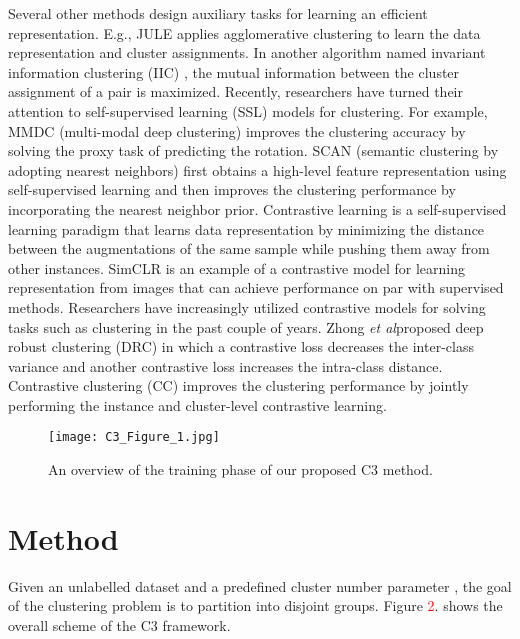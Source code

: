 \documentclass{bmvc2k}
\newcommand{\shadow}[1]{}
\newcommand{\red}[1]{\textcolor{red}{#1}}
\def\s{\shadow}
\def\r{\red}
\def\etal{\emph{et al}\bmvaOneDot}
\begin{document}
Several other methods design auxiliary tasks for learning an efficient representation. E.g., JULE \cite{JULE} applies agglomerative clustering to learn the data representation and cluster assignments. In another algorithm named invariant information clustering (IIC) \cite{IIC}, the mutual information between the cluster assignment of a pair is maximized.
Recently, researchers have turned their attention to self-supervised learning (SSL) models for clustering. For example, MMDC (multi-modal deep clustering) \cite{MMDC} improves the clustering accuracy by solving the proxy task of predicting the rotation. SCAN (semantic clustering by adopting nearest neighbors) \cite{SCAN} first obtains a high-level feature representation using self-supervised learning and then improves the clustering performance by incorporating the nearest neighbor prior.
Contrastive learning is a self-supervised learning paradigm that learns data representation by minimizing the distance between the augmentations of the same sample while pushing them away from other instances. SimCLR \cite{SimCLR} is an example of a contrastive model for learning representation from images that can achieve performance on par with supervised methods. Researchers have increasingly utilized contrastive models for solving tasks such as clustering in the past couple of years. Zhong \etal proposed deep robust clustering (DRC) \cite{DRC} in which a contrastive loss decreases the inter-class variance and another contrastive loss increases the intra-class distance. Contrastive clustering (CC) \cite{CC} improves the clustering performance by jointly performing the instance and cluster-level contrastive learning.
\begin{figure*}[t]
\label{fig11}
  \centering
  \texttt{[image: C3\_Figure\_1.jpg]}
  \caption{An overview of the training phase of our proposed C3 method.}
  \vspace{-7mm}
\end{figure*}
\vspace{-5mm}
\section{Method}
\label{sec:method}
Given an unlabelled dataset  and a predefined cluster number parameter , the goal of the clustering problem is to partition  into  disjoint groups. Figure \r{2}. shows the overall scheme of the C3 framework.

\s{To realize this goal, our proposed method follows a two-step training procedure:}
\s{I suggest, at the begging of the paragraph, first discuss figure 2,  then go over the other matters. In this waa the encoder is defined in the fig2.  }
\end{document}
